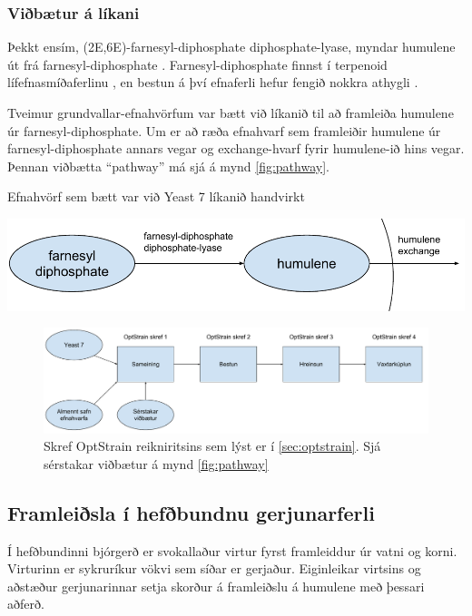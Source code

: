 \documentclass[11pt]{article}
\makeatletter
\newenvironment{figureonecolumn}{\begin{minipage}{\linewidth}\begin{center}\def\@captype{figure}}{\end{center}\end{minipage}}
\makeatother
\begin{document}
\begin{multicols}{2}
\subsubsection{Viðbætur á líkani}
\label{sec:pathway}
Þekkt ensím, (2E,6E)-farnesyl-diphosphate diphosphate-lyase, myndar humulene út frá farnesyl-diphosphate \cite[KEGG: R08373]{Kanehisa01012000}. Farnesyl-diphosphate finnst í terpenoid lífefnasmíðaferlinu \cite[KEGG: rn00900]{Kanehisa01012000}, en bestun á því efnaferli hefur fengið nokkra athygli \cite{BIT:BIT21216,misawa2011pathway,asadollahi2008production}.

Tveimur grundvallar-efnahvörfum var bætt við líkanið til að framleiða humulene úr farnesyl-diphosphate.
Um er að ræða efnahvarf sem framleiðir humulene úr farnesyl-diphosphate annars vegar og exchange-hvarf fyrir humulene-ið hins vegar. Þennan viðbætta ``pathway'' má sjá á mynd \ref{fig:pathway}.

\begin{figureonecolumn}
\caption[Viðbætur við Yeast 7]{Efnahvörf sem bætt var við Yeast 7 líkanið handvirkt}
\label{fig:pathway}
\includegraphics[width=\linewidth]{Pics/HumuleneAddition}
\end{figureonecolumn}
\begin{figure}[b]
\caption[OptStrain reikniritið]{Skref OptStrain reikniritsins sem lýst er í \ref{sec:optstrain}. Sjá sérstakar viðbætur á mynd \ref{fig:pathway}}
\label{fig:flaedirit}
\includegraphics[width=\linewidth]{Pics/OptStrainOverview}
\end{figure}
\subsection{Framleiðsla í hefðbundnu gerjunarferli}
\label{sec:hefdbundid}
Í hefðbundinni bjórgerð er svokallaður virtur fyrst framleiddur úr vatni og korni. Virturinn er sykruríkur vökvi sem síðar er gerjaður. Eiginleikar virtsins og aðstæður gerjunarinnar setja skorður á framleiðslu á humulene með þessari aðferð.

\end{multicols}
\end{document}
